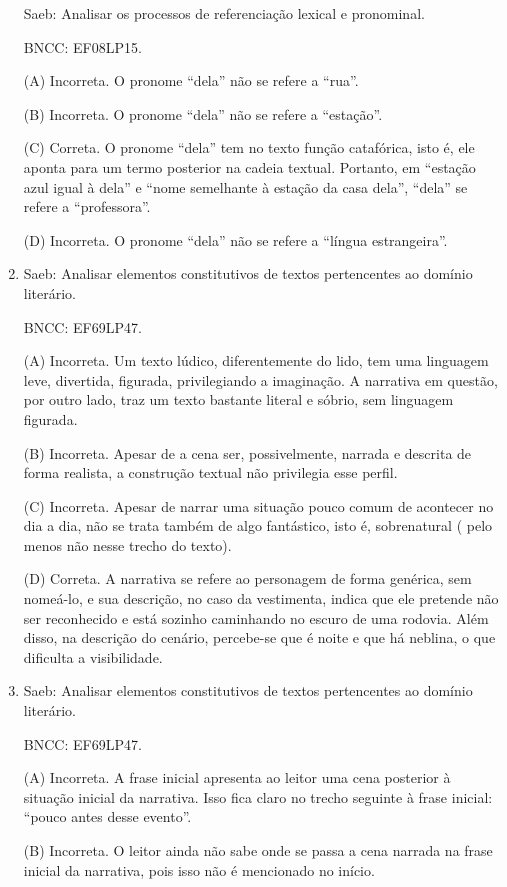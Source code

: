 \begin{enumerate}
Saeb: Analisar os processos de referenciação lexical e pronominal.

BNCC: EF08LP15.

(A) Incorreta. O pronome ``dela'' não se refere a ``rua''.

(B) Incorreta. O pronome ``dela'' não se refere a ``estação''.

(C) Correta. O pronome ``dela'' tem no texto função catafórica, isto é,
ele aponta para um termo posterior na cadeia textual. Portanto, em
``estação azul igual à dela'' e ``nome semelhante à estação da casa
dela'', ``dela'' se refere a ``professora''.

(D) Incorreta. O pronome ``dela'' não se refere a ``língua
estrangeira''.

\item

Saeb: Analisar elementos constitutivos de textos pertencentes ao domínio
literário.

BNCC: EF69LP47.

(A) Incorreta. Um texto lúdico, diferentemente do lido, tem uma linguagem leve, divertida, figurada, privilegiando a imaginação. A narrativa em questão, por outro lado, traz um texto bastante literal e sóbrio, sem linguagem figurada.

(B) Incorreta. Apesar de a cena ser, possivelmente, narrada e descrita de forma realista, a construção textual não privilegia esse perfil.

(C) Incorreta. Apesar de narrar uma situação pouco comum de acontecer no
dia a dia, não se trata também de algo fantástico, isto é, sobrenatural (
pelo menos não nesse trecho do texto).

(D) Correta. A narrativa se refere ao personagem de forma genérica, sem
nomeá-lo, e sua descrição, no caso da vestimenta, indica que ele
pretende não ser reconhecido e está sozinho caminhando no escuro de uma
rodovia. Além disso, na descrição do cenário, percebe-se que é noite e
que há neblina, o que dificulta a visibilidade.

\item

Saeb: Analisar elementos constitutivos de textos pertencentes ao domínio
literário.

BNCC: EF69LP47.

(A) Incorreta. A frase inicial apresenta ao leitor uma cena posterior à
situação inicial da narrativa. Isso fica claro no trecho seguinte à
frase inicial: ``pouco antes desse evento''.

(B) Incorreta. O leitor ainda não sabe onde se passa a cena narrada na
frase inicial da narrativa, pois isso não é mencionado no início.


\end{enumerate}
